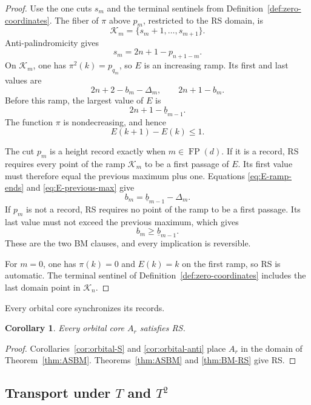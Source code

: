 \documentclass[11pt]{article}
\newtheorem{corollary}[theorem]{Corollary}
\theoremstyle{definition}
\theoremstyle{remark}
\DeclareMathOperator{\FP}{FP}
\begin{document}
\begin{proof}
Use the one cuts \(s_m\) and the terminal sentinels from
Definition~\ref{def:zero-coordinates}.
The fiber of \(\pi\) above \(p_m\), restricted to the RS domain, is
\begin{equation*}
 \mathcal K_m=\{s_m+1,\ldots,s_{m+1}\}.
\end{equation*}
Anti-palindromicity gives
\[
 s_m=2n+1-p_{n+1-m}.
\]
On \(\mathcal K_m\), one has \(\pi^2(k)=p_{q_m}\), so \(E\) is an increasing
ramp.  Its first and last values are
\begin{equation}
\label{eq:E-ramp-ends}
 2n+2-b_m-\Delta_m,
 \qquad 2n+1-b_m.
\end{equation}
Before this ramp, the largest value of \(E\) is
\begin{equation}
\label{eq:E-previous-max}
 2n+1-\underline b_{m-1}.
\end{equation}
The function \(\pi\) is nondecreasing, and hence
\[
 E(k+1)-E(k)\leq1.
\]

The cut \(p_m\) is a height record exactly when \(m\in\FP(d)\).  If it is a
record, RS requires every point of the ramp \(\mathcal K_m\) to be a first
passage of \(E\).  Its first value must therefore equal the previous maximum
plus one.  Equations \eqref{eq:E-ramp-ends} and
\eqref{eq:E-previous-max} give
\[
 b_m=\underline b_{m-1}-\Delta_m.
\]
If \(p_m\) is not a record, RS requires no point of the ramp to be a first
passage.  Its last value must not exceed the previous maximum, which gives
\[
 b_m\geq\underline b_{m-1}.
\]
These are the two BM clauses, and every implication is reversible.

For \(m=0\), one has \(\pi(k)=0\) and \(E(k)=k\) on the first ramp, so RS is
automatic.  The terminal sentinel of
Definition~\ref{def:zero-coordinates} includes the last domain point in
\(\mathcal K_n\).
\end{proof}

Every orbital core synchronizes its records.
\begin{corollary}
\label{cor:orbital-RS}
Every orbital core \(A_r\) satisfies RS.
\end{corollary}

\begin{proof}
Corollaries~\ref{cor:orbital-S} and \ref{cor:orbital-anti} place \(A_r\) in
the domain of Theorem~\ref{thm:ASBM}.  Theorems~\ref{thm:ASBM} and
\ref{thm:BM-RS} give RS.
\end{proof}

\subsection{Transport under \texorpdfstring{\(T\)}{T} and \texorpdfstring{\(T^2\)}{T2}}
\end{document}
